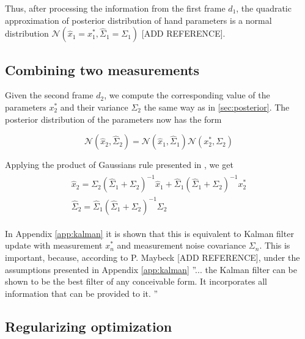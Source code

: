 \documentclass[10pt,twocolumn,letterpaper]{article}
\begin{document}
Thus, after processing the information from the first frame $d_1$, the quadratic approximation of posterior distribution of hand parameters is a normal distribution $\mathcal{N}\left(\hat{x}_1 = x_1^*,  \hat{\Sigma}_1 = \Sigma_1 \right)$ [ADD REFERENCE].

\subsection {Combining two measurements}

Given the second frame $d_2$, we compute the corresponding value of the parameters $x_2^*$ and their variance $\Sigma_2$ the same way as in \ref{sec:posterior}. The posterior distribution of the parameters now has the form 

\begin{equation}
\mathcal{N}(\hat{x}_2, \hat{\Sigma}_2) = \mathcal{N}(\hat{x}_1, \hat{\Sigma}_1) \mathcal{N}(x_2^*, \Sigma_2)
\end{equation}

Applying the product of Gaussians rule presented in \cite{petersen2008matrix}, we get 
\begin{align}
\begin{split}
\hat{x}_2 = \Sigma_2 (\hat{\Sigma}_1 + \Sigma_2)^{-1} \hat{x}_1 + 
\hat{\Sigma}_1 (\hat{\Sigma}_1 + \Sigma_2)^{-1} x_2^*\\
\hat{\Sigma}_2 = \hat{\Sigma}_1 (\hat{\Sigma}_1 + \Sigma_2)^{-1} \Sigma_2
\end{split} \label{eq:gaussians-product}
\end{align}

In Appendix \ref{app:kalman} it is shown that this is equivalent to Kalman filter update with measurement $x_n^*$ and measurement noise covariance $\Sigma_n$. This is important, because, according to P. Maybeck [ADD REFERENCE], under the assumptions presented in Appendix \ref{app:kalman} ''... the Kalman filter can be shown to be the best filter of any conceivable form. It incorporates all information that can be provided to it. ''

\subsection{Regularizing optimization}
\end{document}
